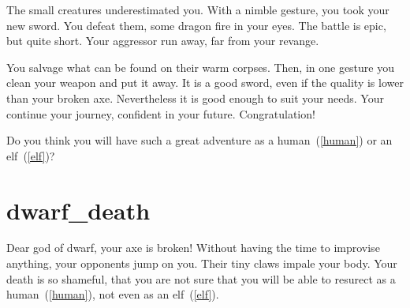 The small creatures underestimated you. With a nimble gesture, you took your new
sword. You defeat them, some dragon fire in your eyes. The battle is epic, but
quite short. Your aggressor run away, far from your revange.

You salvage what can be found on their warm corpses. Then, in one gesture you
clean your weapon and put it away. It is a good sword, even if the quality is
lower than your broken axe. Nevertheless it is good enough to suit your needs.
Your continue your journey, confident in your future. Congratulation!

\medbreak

Do you think you will have such a great adventure as a human~(\ref{human}) or
an elf~(\ref{elf})?

\section{dwarf_death}

Dear god of dwarf, your axe is broken! Without having the time to improvise
anything, your opponents jump on you. Their tiny claws impale your body. Your
death is so shameful, that you are not sure that you will be able to resurect as
a human~(\ref{human}), not even as an elf~(\ref{elf}).
